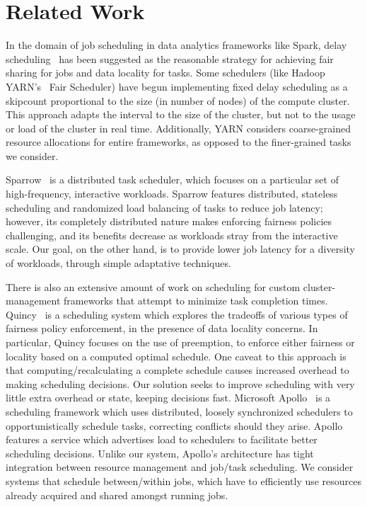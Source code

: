 \section{Related Work}\label{sec:related}
In the domain of job scheduling in data analytics frameworks like Spark, delay scheduling~\cite{Zaharia2010} has been suggested as the reasonable strategy for
achieving fair sharing for jobs and data locality for tasks.
Some schedulers (like Hadoop YARN's~\cite{Vavilapalli2013} Fair Scheduler) have begun implementing
fixed delay scheduling as a skipcount proportional to the size (in number of nodes) of the compute cluster. 
This approach adapts the interval to the size of the cluster, but not to the usage or load of the 
cluster in real time. Additionally, YARN considers coarse-grained resource allocations for entire frameworks, 
as opposed to the finer-grained tasks we consider.

Sparrow~\cite{Ousterhout2013} is a distributed task scheduler, which focuses on a particular 
set of high-frequency, interactive workloads. Sparrow features distributed, stateless scheduling 
and randomized load balancing of tasks to reduce job latency; however, its completely distributed nature makes enforcing 
fairness policies challenging, and its benefits decrease as workloads stray from the interactive scale.
Our goal, on the other hand, is to provide lower job latency for a diversity of workloads, 
through simple adaptative techniques.

There is also an extensive amount of work on scheduling for custom cluster-management frameworks that attempt to minimize task completion times.
Quincy~\cite{Isard:2009} is a scheduling system which explores the tradeoffs of various types of fairness
policy enforcement, in the presence of data locality concerns. In particular, Quincy focuses on the use
of preemption, to enforce either fairness or locality based on a computed optimal schedule. One caveat to 
this approach is that computing/recalculating a complete schedule causes increased overhead to making
scheduling decisions. Our solution seeks to improve scheduling with very little extra overhead or state, keeping
decisions fast.
Microsoft Apollo~\cite{Boutin2014} is a scheduling framework which uses distributed, 
loosely synchronized schedulers to opportunistically schedule tasks, correcting conflicts should they arise.
Apollo features a service which advertises load to schedulers to facilitate better scheduling decisions. Unlike
our system, Apollo's architecture has tight integration between resource management and job/task scheduling. We
consider systems that schedule between/within jobs, which have to efficiently use resources already acquired and
shared amongst running jobs.

